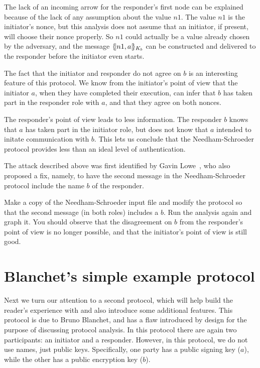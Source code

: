 The lack of an incoming arrow for the responder's first node can be
explained because of the lack of any assumption about the value $n1$.
The value $n1$ is the initiator's nonce, but this analysis does not
assume that an initiator, if present, will choose their nonce
properly.  So $n1$ could actually be a value already chosen by the
adversary, and the message $\{\!|n1,a|\!\}_{K_b}$ can be constructed and
delivered to the responder before the initiator even starts.

The fact that the initiator and responder do not agree on $b$ is an
interesting feature of this protocol.  We know from the initiator's
point of view that the initiator $a$, when they have completed their
execution, can infer that $b$ has taken part in the responder role
with $a$, and that they agree on both nonces.

The responder's point of view leads to less information.  The
responder $b$ knows that $a$ has taken part in the initiator role, but
does not know that $a$ intended to initate communication with $b$.
This lets us conclude that the Needham-Schroeder protocol provides
less than an ideal level of authentication.

\begin{exercise}
  The attack described above was first identified by Gavin
  Lowe~\cite{Lowe96a}, who also proposed a fix, namely, to have the
  second message in the Needham-Schroeder protocol include the name
  $b$ of the responder.

Make a copy of the Needham-Schroeder input file and modify the
protocol so that the second message (in both roles) includes a $b$.
Run the analysis again and graph it.  You should observe that the
disagreement on $b$ from the responder's point of view is no longer
possible, and that the initiator's point of view is still good.
\end{exercise}

\section{Blanchet's simple example protocol}
\label{sec:blanchet}

  Next we turn our
attention to a second protocol, which will help build the reader's
experience with {\cpsa} and also introduce some additional features.
This protocol is due to Bruno Blanchet, and has a flaw introduced by
design for the purpose of discussing protocol analysis.  In this
protocol there are again two participants: an initiator and a
responder.  However, in this protocol, we do not use names, just
public keys.  Specifically, one party has a public signing key ($a$),
while the other has a public encryption key ($b$).

